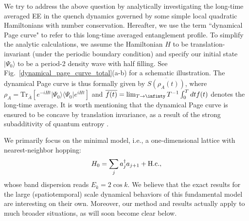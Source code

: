 \documentclass[twocolumn,english,prl,aps,superscriptaddress,amsmath,amssymb,floatfix]{revtex4-2}
\def \Tr {\mathrm{Tr}}
\begin{document}
We try to address the above question by %
analytically investigating the long-time averaged EE in the quench dynamics governed by %
some simple local quadratic Hamiltonians with number conservation. Hereafter, we use the term ``dynamical Page curve" to refer to this long-time averaged entanglement profile. 
To simplify the analytic calculations, we assume the Hamiltonian $H$ to be translation-invariant (under the periodic boundary condition) and specify our initial state $|\Psi_0\rangle$ to be %
a period-2 density wave with half filling. See Fig.~\ref{dynamical_page_curve_total}(a-b) for a schematic illustration. The dynamical Page curve is thus formally given by $\overline{S(\rho_A(t))}$, where $\rho_A=\Tr_{\bar A}[e^{-iHt}|\Psi_0\rangle\langle\Psi_0|e^{iHt}]$ and $\overline{f(t)}=\lim_{T\to\infinty}T^{-1}\int^T_0 dt f(t)$ denotes the long-time average. It is worth mentioning that the dynamical Page curve is ensured to be concave by translation invariance, as a result of the strong subadditivity of quantum entropy \cite{Wolf2008}.

We primarily focus on the minimal %
model, i.e., a one-dimensional lattice with nearest-neighbor hopping:
\begin{equation}
H_{0}=\sum_{j}a_{j}^{\dagger}a_{j+1}+{\rm H.c.},
\label{eq:NNH_Hamiltonian}
\end{equation}
whose %
band dispersion reads $E_k=2\cos k$. We believe that the exact results for the large (spatiotemporal) scale dynamical behaviors of this fundamental model are interesting on their own.  Moreover, our method and results actually apply to much broader situations, as will soon become clear below. %
\end{document}
